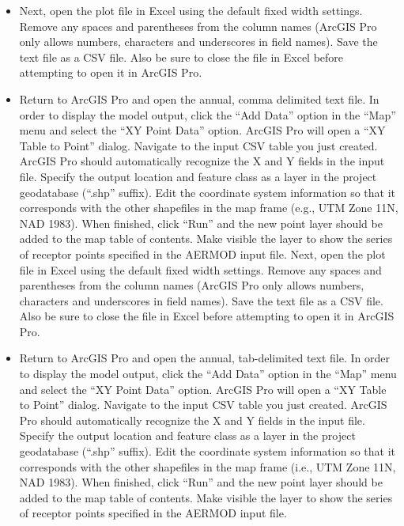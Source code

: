 \documentclass[
  letterpaper,
  DIV=11,
  numbers=noendperiod]{scrartcl}
\begin{document}
\begin{itemize}
\begin{figure}
  \end{figure}
\item
  Next, open the plot file in Excel using the default fixed width
  settings. Remove any spaces and parentheses from the column names
  (ArcGIS Pro only allows numbers, characters and underscores in field
  names). Save the text file as a CSV file. Also be sure to close the
  file in Excel before attempting to open it in ArcGIS Pro.
\item
  Return to ArcGIS Pro and open the annual, comma delimited text file.
  In order to display the model output, click the ``Add Data'' option in
  the ``Map'' menu and select the ``XY Point Data'' option. ArcGIS Pro
  will open a ``XY Table to Point'' dialog. Navigate to the input CSV
  table you just created. ArcGIS Pro should automatically recognize the
  X and Y fields in the input file. Specify the output location and
  feature class as a layer in the project geodatabase (``.shp'' suffix).
  Edit the coordinate system information so that it corresponds with the
  other shapefiles in the map frame (e.g., UTM Zone 11N, NAD 1983). When
  finished, click ``Run'' and the new point layer should be added to the
  map table of contents. Make visible the layer to show the series of
  receptor points specified in the AERMOD input file. Next, open the
  plot file in Excel using the default fixed width settings. Remove any
  spaces and parentheses from the column names (ArcGIS Pro only allows
  numbers, characters and underscores in field names). Save the text
  file as a CSV file. Also be sure to close the file in Excel before
  attempting to open it in ArcGIS Pro.
\item
  Return to ArcGIS Pro and open the annual, tab-delimited text file. In
  order to display the model output, click the ``Add Data'' option in
  the ``Map'' menu and select the ``XY Point Data'' option. ArcGIS Pro
  will open a ``XY Table to Point'' dialog. Navigate to the input CSV
  table you just created. ArcGIS Pro should automatically recognize the
  X and Y fields in the input file. Specify the output location and
  feature class as a layer in the project geodatabase (``.shp'' suffix).
  Edit the coordinate system information so that it corresponds with the
  other shapefiles in the map frame (i.e., UTM Zone 11N, NAD 1983). When
  finished, click ``Run'' and the new point layer should be added to the
  map table of contents. Make visible the layer to show the series of
  receptor points specified in the AERMOD input file.


\end{itemize}
\end{document}
